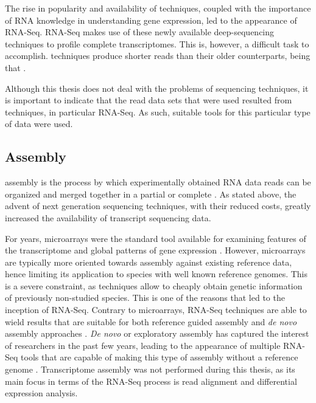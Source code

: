 The rise in popularity and availability of \ngs{} techniques, coupled with the
importance of RNA knowledge in understanding gene expression, led to the
appearance of RNA-Seq. RNA-Seq makes use of these newly available
deep-sequencing techniques to profile complete transcriptomes. This is, however,
a difficult task to accomplish. \ngs{} techniques produce shorter reads than
their older counterparts, being that 
\cite[p. 671]{Martin2011}.

Although this thesis does not deal with the problems of sequencing techniques, it
is important to indicate that the read data sets that were used resulted from
\ngs{} techniques, in particular RNA-Seq. As such, suitable tools for this
particular type of data were used.

\subsection{\Trans{} Assembly}\label{sec:transassembly}


\Trans{} assembly is the process by which experimentally obtained RNA data reads
can be organized and merged together in a partial or complete \trans. As stated
above, the advent of next generation sequencing techniques, with their reduced
costs, greatly increased the availability of transcript sequencing data.

For years, microarrays were the standard tool available for examining features
of the transcriptome and global patterns of gene expression \cite{Wolf2013}.
However, microarrays are typically more oriented towards assembly against
existing reference data, hence limiting its application to species with well
known reference genomes. This is a severe constraint, as \ngs{} techniques allow
to cheaply obtain genetic information of previously non-studied species. This is
one of the reasons that led to the inception of RNA-Seq. Contrary to
microarrays, RNA-Seq techniques are able to wield results that are suitable for
both reference guided assembly and \textit{de novo} assembly approaches
\cite{Wilhelm2009}. \textit{De novo} or exploratory assembly has captured the
interest of researchers in the past few years, leading to the appearance of
multiple RNA-Seq tools that are capable of making this type of assembly without
a reference genome \cite{nuno11:assemblathon}. Transcriptome assembly was not
performed during this thesis, as its main focus in terms of the RNA-Seq process
is read alignment and differential expression analysis.

